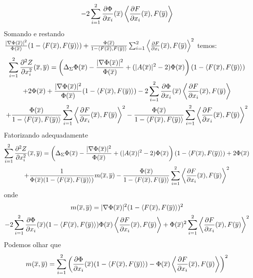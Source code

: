 \begin{demonstracao}
\begin{multline*}
	- 2 \sum_{i=1}^2 \frac{\partial \Phi}{\partial x_i}(\overline{x}) \left\langle \frac{\partial F}{\partial x_i}(\overline{x}), F(\overline{y}) \right\rangle
	\end{multline*}	
	Somando e restando $\frac{|\nabla \Phi(\overline{x})|^2}{\Phi(\overline{x})} (1 - \langle F(\overline{x}), F(\overline{y}) \rangle) + \frac{\Phi(\overline{x})}{1 - \langle F(\overline{x}),F(\overline{y}) \rangle} \sum_{i=1}^2 \left\langle \frac{\partial F}{\partial x_i} (\overline{x}), F(\overline{y}) \right\rangle^2$ temos:
	\begin{multline*}
	\sum_{i=1}^2 \frac{\partial^2 Z}{\partial x_i^2}(\overline{x},\overline{y}) = \left(\Delta_{\Sigma} \Phi(\overline{x}) - \frac{|\nabla \Phi(\overline{x})|^2}{\Phi(\overline{x})} + (|A(\overline{x})|^2 - 2)\Phi(\overline{x})\right)(1 - \langle F(\overline{x}), F(\overline{y}) \rangle)\\
	+ 2 \Phi(\overline{x}) + \frac{|\nabla \Phi(\overline{x})|^2}{\Phi(\overline{x})} (1 - \langle F(\overline{x}), F(\overline{y}) \rangle) - 2 \sum_{i=1}^2 \frac{\partial \Phi}{\partial x_i}(\overline{x}) \left\langle \frac{\partial F}{\partial x_i}(\overline{x}), F(\overline{y}) \right\rangle\\
	+ \frac{\Phi(\overline{x})}{1 - \langle F(\overline{x}),F(\overline{y}) \rangle} \sum_{i=1}^2 \left\langle \frac{\partial F}{\partial x_i} (\overline{x}), F(\overline{y}) \right\rangle^2 - \frac{\Phi(\overline{x})}{1 - \langle F(\overline{x}),F(\overline{y}) \rangle} \sum_{i=1}^2 \left\langle \frac{\partial F}{\partial x_i} (\overline{x}), F(\overline{y}) \right\rangle^2
	\end{multline*}	
	Fatorizando adequadamente
	\begin{multline*}
	\sum_{i=1}^2 \frac{\partial^2 Z}{\partial x_i^2}(\overline{x},\overline{y}) = \left(\Delta_{\Sigma} \Phi(\overline{x}) - \frac{|\nabla \Phi(\overline{x})|^2}{\Phi(\overline{x})} + (|A(\overline{x})|^2 - 2)\Phi(\overline{x})\right)(1 - \langle F(\overline{x}), F(\overline{y}) \rangle)+ 2 \Phi(\overline{x})	\\
	+ \frac{1}{\Phi(\overline{x})(1 - \langle F(\overline{x}), F(\overline{y}) \rangle)}	m(\overline{x},\overline{y}) - \frac{\Phi(\overline{x})}{1 - \langle F(\overline{x}),F(\overline{y}) \rangle} \sum_{i=1}^2 \left\langle \frac{\partial F}{\partial x_i} (\overline{x}), F(\overline{y}) \right\rangle^2
	\end{multline*}	
	onde
	\begin{multline*}
	m(\overline{x},\overline{y}) = |\nabla \Phi(\overline{x})|^2 (1 - \langle F(\overline{x}), F(\overline{y}) \rangle)^2 \\
	- 2 \sum_{i=1}^2 \frac{\partial \Phi}{\partial x_i}(\overline{x}) (1 - \langle F(\overline{x}), F(\overline{y}) \rangle) \Phi(\overline{x}) \left\langle \frac{\partial F}{\partial x_i}(\overline{x}), F(\overline{y}) \right\rangle + \Phi(\overline{x})^2 \sum_{i=1}^2 \left\langle \frac{\partial F}{\partial x_i} (\overline{x}), F(\overline{y}) \right\rangle^2
	\end{multline*}	
	Podemos olhar que
	\begin{equation*}
	m(\xb,\yb) = \sum_{i=1}^2 \left(  \frac{\partial \Phi}{\partial x_i}(\xb)(1 - \langle F(\xb),F(\yb) \rangle) - \Phi(\xb) \left\langle \frac{\partial F}{\partial x_i}(\xb), F(\yb) \right\rangle \right)^2

\end{equation*}
\end{demonstracao}
